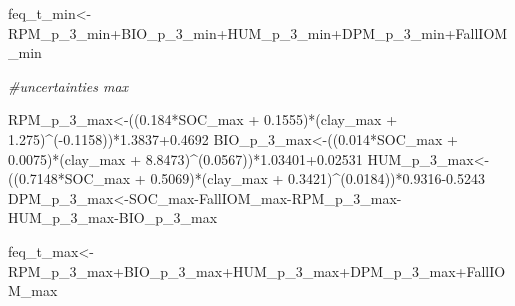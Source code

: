 \documentclass[
  10pt,
  b5paper,
]{book}
\newenvironment{Shaded}{\begin{snugshade}}{\end{snugshade}}
\newcommand{\CommentTok}[1]{\textcolor[rgb]{0.56,0.35,0.01}{\textit{#1}}}
\newcommand{\FloatTok}[1]{\textcolor[rgb]{0.00,0.00,0.81}{#1}}
\newcommand{\NormalTok}[1]{#1}
\newcommand{\OtherTok}[1]{\textcolor[rgb]{0.56,0.35,0.01}{#1}}
\newcommand{\SpecialCharTok}[1]{\textcolor[rgb]{0.00,0.00,0.00}{#1}}
\begin{document}
\begin{Shaded}
\begin{Highlighting}[]
\NormalTok{feq\_t\_min}\OtherTok{\textless{}{-}}\NormalTok{RPM\_p\_3\_min}\SpecialCharTok{+}\NormalTok{BIO\_p\_3\_min}\SpecialCharTok{+}\NormalTok{HUM\_p\_3\_min}\SpecialCharTok{+}\NormalTok{DPM\_p\_3\_min}\SpecialCharTok{+}\NormalTok{FallIOM\_min}

\CommentTok{\#uncertainties max}

\NormalTok{RPM\_p\_3\_max}\OtherTok{\textless{}{-}}\NormalTok{((}\FloatTok{0.184}\SpecialCharTok{*}\NormalTok{SOC\_max }\SpecialCharTok{+} \FloatTok{0.1555}\NormalTok{)}\SpecialCharTok{*}\NormalTok{(clay\_max }\SpecialCharTok{+} \FloatTok{1.275}\NormalTok{)}\SpecialCharTok{\^{}}\NormalTok{(}\SpecialCharTok{{-}}\FloatTok{0.1158}\NormalTok{))}\SpecialCharTok{*}\FloatTok{1.3837+0.4692}
\NormalTok{BIO\_p\_3\_max}\OtherTok{\textless{}{-}}\NormalTok{((}\FloatTok{0.014}\SpecialCharTok{*}\NormalTok{SOC\_max }\SpecialCharTok{+} \FloatTok{0.0075}\NormalTok{)}\SpecialCharTok{*}\NormalTok{(clay\_max }\SpecialCharTok{+} \FloatTok{8.8473}\NormalTok{)}\SpecialCharTok{\^{}}\NormalTok{(}\FloatTok{0.0567}\NormalTok{))}\SpecialCharTok{*}\FloatTok{1.03401+0.02531}
\NormalTok{HUM\_p\_3\_max}\OtherTok{\textless{}{-}}\NormalTok{((}\FloatTok{0.7148}\SpecialCharTok{*}\NormalTok{SOC\_max }\SpecialCharTok{+} \FloatTok{0.5069}\NormalTok{)}\SpecialCharTok{*}\NormalTok{(clay\_max }\SpecialCharTok{+} \FloatTok{0.3421}\NormalTok{)}\SpecialCharTok{\^{}}\NormalTok{(}\FloatTok{0.0184}\NormalTok{))}\SpecialCharTok{*}\FloatTok{0.9316{-}0.5243}
\NormalTok{DPM\_p\_3\_max}\OtherTok{\textless{}{-}}\NormalTok{SOC\_max}\SpecialCharTok{{-}}\NormalTok{FallIOM\_max}\SpecialCharTok{{-}}\NormalTok{RPM\_p\_3\_max}\SpecialCharTok{{-}}\NormalTok{HUM\_p\_3\_max}\SpecialCharTok{{-}}\NormalTok{BIO\_p\_3\_max}

\NormalTok{feq\_t\_max}\OtherTok{\textless{}{-}}\NormalTok{RPM\_p\_3\_max}\SpecialCharTok{+}\NormalTok{BIO\_p\_3\_max}\SpecialCharTok{+}\NormalTok{HUM\_p\_3\_max}\SpecialCharTok{+}\NormalTok{DPM\_p\_3\_max}\SpecialCharTok{+}\NormalTok{FallIOM\_max}



\end{Highlighting}
\end{Shaded}
\end{document}
